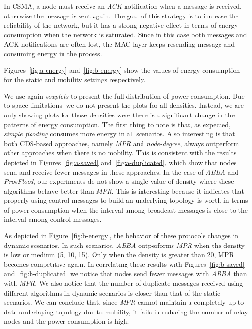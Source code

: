 %
In CSMA, a node must receive an \textit{ACK} notification when a message is received, otherwise the message is sent again.
%
The goal of this strategy is to increase the reliability of the network, but it has a strong negative effect in terms of energy consumption when the network is saturated.
%
Since in this case both messages and ACK notifications are often lost, the MAC layer keeps resending message and consuming energy in the process.
%

Figures~\ref{fig:a-energy} and~\ref{fig:b-energy} show the values of energy consumption for the static and mobility settings respectively.
%

We use again \textit{boxplots} to present the full distribution of power consumption.
%
Due to space limitations, we do not present the plots for all densities.
%
Instead, we are only showing plots for those densities were there is a significant change in the patterns of energy consumption.
% 
The first thing to note is that, as expected, \textit{simple flooding} consumes more energy in all scenarios.
%
Also interesting is that both CDS-based approaches, namely \textit{MPR} and \textit{node-degree}, always outperform other approaches when there is no mobility.
%
This is consistent with the results depicted in Figures~\ref{fig:a-saved} and~\ref{fig:a-duplicated}, which show that nodes send and receive fewer messages in these approaches.
%
In the case of \textit{ABBA} and \textit{ProbFlood}, our experiments do not show a single value of density where these algorithms behave better than \textit{MPR}.
%
This is interesting because it indicates that properly using control messages to build an underlying topology is worth in terms of power consumption when the interval among broadcast messages is close to the interval among control messages.
%

As depicted in Figure~\ref{fig:b-energy}, the behavior of these protocols changes in dynamic scenarios.
%
In such scenarios, \textit{ABBA} outperforms \textit{MPR} when the density is low or medium (5, 10, 15).
%
Only when the density is greater than 20, MPR becomes competitive again.
%
In correlating these results with Figures~\ref{fig:b-saved} and~\ref{fig:b-duplicated} we notice that nodes send fewer messages with \textit{ABBA} than with \textit{MPR}.
%
We also notice that the number of duplicate messages received using different algorithms in dynamic scenarios is closer than that of the static scenarios.
%
%
We can conclude that, since \textit{MPR} cannot maintain a completely up-to-date underlaying topology due to mobility, it fails in reducing the number of relay nodes and the power consumption is high.

